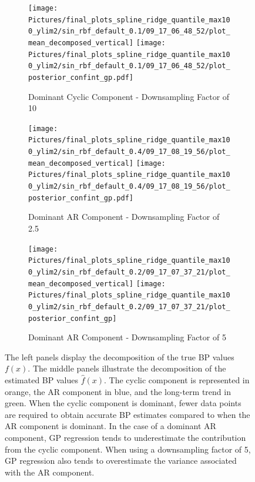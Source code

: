 \begin{figure}

\begin{subfigure}{\textwidth}
    \centering
    \texttt{[image: 
    Pictures/final\_plots\_spline\_ridge\_quantile\_max100\_ylim2/sin\_rbf\_default\_0.1/09\_17\_06\_48\_52/plot\_mean\_decomposed\_vertical]}
    \texttt{[image: 
    Pictures/final\_plots\_spline\_ridge\_quantile\_max100\_ylim2/sin\_rbf\_default\_0.1/09\_17\_06\_48\_52/plot\_posterior\_confint\_gp.pdf]}
  \caption{Dominant Cyclic Component - Downsampling Factor of 10}
\end{subfigure}

\begin{subfigure}{\textwidth}
    \centering
    \texttt{[image: 
        Pictures/final\_plots\_spline\_ridge\_quantile\_max100\_ylim2/sin\_rbf\_default\_0.4/09\_17\_08\_19\_56/plot\_mean\_decomposed\_vertical]}
    \texttt{[image: 
         Pictures/final\_plots\_spline\_ridge\_quantile\_max100\_ylim2/sin\_rbf\_default\_0.4/09\_17\_08\_19\_56/plot\_posterior\_confint\_gp.pdf]}
  \caption{Dominant AR Component - Downsampling Factor of 2.5}
    \label{subfig:mean-decomposed-ar-low-downsampling}
\end{subfigure}\hfill

\begin{subfigure}{\textwidth}
    \centering
    \texttt{[image: 
    Pictures/final\_plots\_spline\_ridge\_quantile\_max100\_ylim2/sin\_rbf\_default\_0.2/09\_17\_07\_37\_21/plot\_mean\_decomposed\_vertical]}
    \texttt{[image: 
       Pictures/final\_plots\_spline\_ridge\_quantile\_max100\_ylim2/sin\_rbf\_default\_0.2/09\_17\_07\_37\_21/plot\_posterior\_confint\_gp]}
  \caption{Dominant AR Component - Downsampling Factor of 5}
    \label{subfig:mean-decomposed-ar}
\end{subfigure}\hfill
\label{fig:mean-decomposed-ar-cyclic}
\caption[Dominant Cyclic Component vs. Dominant AR Component: Decomposition of $f(x)$]{
    The left panels display the decomposition of the true BP values $f(x)$.
    The middle panels illustrate the decomposition of the estimated BP values $\hat{f}(x)$.
    The cyclic component is represented in orange,
    the AR component in blue, and the long-term trend in green.
    When the cyclic component is dominant, fewer data points are required to obtain accurate BP estimates
    compared to when the AR component is dominant.
    In the case of a dominant AR component, GP regression tends to underestimate
    the contribution from the cyclic component.
    When using a downsampling factor of 5, GP regression also tends to overestimate
    the variance associated with the AR component.
}

\end{figure}


